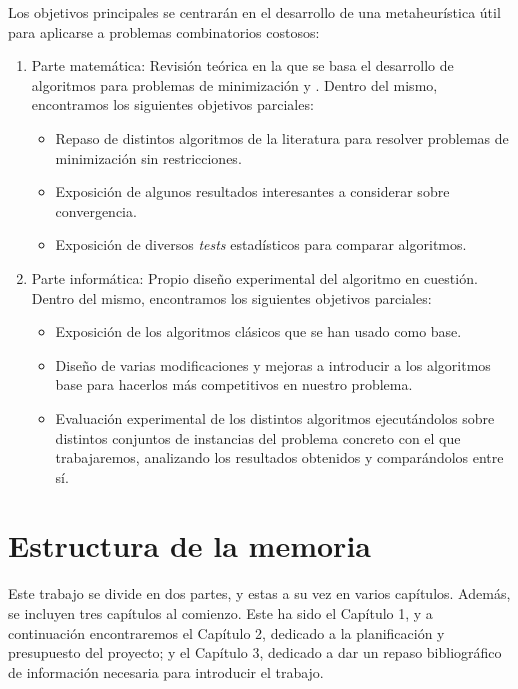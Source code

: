 Los objetivos principales se centrarán en el desarrollo de una metaheurística útil para aplicarse a problemas combinatorios costosos:
\begin{enumerate}
	\item Parte matemática: Revisión teórica en la que se basa el desarrollo de algoritmos para problemas de minimización y . 
	Dentro del mismo, encontramos los siguientes objetivos parciales:
	\begin{itemize}
		\item Repaso de distintos algoritmos de la literatura para resolver problemas de minimización sin restricciones. 
		\item Exposición de algunos resultados interesantes a considerar sobre convergencia. 
		\item Exposición de diversos \textit{tests} estadísticos para comparar algoritmos. 
	\end{itemize}
	
	\item Parte informática: Propio diseño experimental del algoritmo en cuestión. 
	Dentro del mismo, encontramos los siguientes objetivos parciales: 
	\begin{itemize}
		\item Exposición de los algoritmos clásicos que se han usado como base.
		\item Diseño de varias modificaciones y mejoras a introducir a los algoritmos base para hacerlos más competitivos en nuestro problema. 
		\item Evaluación experimental de los distintos algoritmos ejecutándolos sobre distintos conjuntos de instancias del problema concreto con el que trabajaremos, analizando los resultados obtenidos y comparándolos entre sí.
	\end{itemize}
	
\end{enumerate}

\section{Estructura de la memoria}

Este trabajo se divide en dos partes, y estas a su vez en varios capítulos. 
Además, se incluyen tres capítulos al comienzo. 
Este ha sido el Capítulo 1, y a continuación encontraremos el Capítulo 2, dedicado a la planificación y presupuesto del proyecto; y el Capítulo 3, dedicado a dar un repaso bibliográfico de información necesaria para introducir el trabajo.

